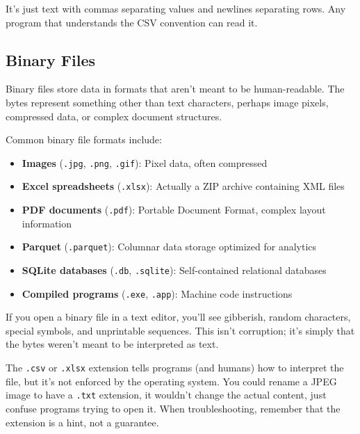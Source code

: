 \documentclass[
  letterpaper,
  DIV=11,
  numbers=noendperiod]{scrreprt}
\providecommand{\tightlist}{%
  \setlength{\itemsep}{0pt}\setlength{\parskip}{0pt}}
\begin{document}
It's just text with commas separating values and newlines separating
rows. Any program that understands the CSV convention can read it.

\subsection{Binary Files}\label{binary-files}

Binary files store data in formats that aren't meant to be
human-readable. The bytes represent something other than text
characters, perhaps image pixels, compressed data, or complex document
structures.

Common binary file formats include:

\begin{itemize}
\tightlist
\item
  \textbf{Images} (\texttt{.jpg}, \texttt{.png}, \texttt{.gif}): Pixel
  data, often compressed
\item
  \textbf{Excel spreadsheets} (\texttt{.xlsx}): Actually a ZIP archive
  containing XML files
\item
  \textbf{PDF documents} (\texttt{.pdf}): Portable Document Format,
  complex layout information
\item
  \textbf{Parquet} (\texttt{.parquet}): Columnar data storage optimized
  for analytics
\item
  \textbf{SQLite databases} (\texttt{.db}, \texttt{.sqlite}):
  Self-contained relational databases
\item
  \textbf{Compiled programs} (\texttt{.exe}, \texttt{.app}): Machine
  code instructions
\end{itemize}

If you open a binary file in a text editor, you'll see gibberish, random
characters, special symbols, and unprintable sequences. This isn't
corruption; it's simply that the bytes weren't meant to be interpreted
as text.

\begin{tcolorbox}[enhanced jigsaw, opacitybacktitle=0.6, arc=.35mm, colback=white, bottomtitle=1mm, opacityback=0, toprule=.15mm, left=2mm, colbacktitle=quarto-callout-note-color!10!white, breakable, coltitle=black, toptitle=1mm, colframe=quarto-callout-note-color-frame, bottomrule=.15mm, titlerule=0mm, title=\textcolor{quarto-callout-note-color}{\faInfo}\hspace{0.5em}{File Extensions Are Just Conventions}, rightrule=.15mm, leftrule=.75mm]

The \texttt{.csv} or \texttt{.xlsx} extension tells programs (and
humans) how to interpret the file, but it's not enforced by the
operating system. You could rename a JPEG image to have a \texttt{.txt}
extension, it wouldn't change the actual content, just confuse programs
trying to open it. When troubleshooting, remember that the extension is
a hint, not a guarantee.

\end{tcolorbox}
\end{document}
